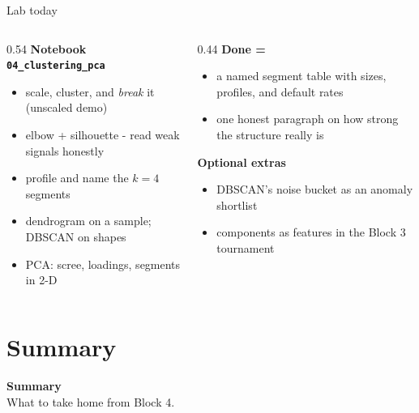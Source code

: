 \documentclass[10pt,aspectratio=169]{beamer}
\begin{document}
\begin{frame}{Lab today}
  \begin{columns}[T]
    \begin{column}{0.54\textwidth}
      \textbf{Notebook \texttt{04\_clustering\_pca}}
      \begin{itemize}\small
        \item scale, cluster, and \emph{break} it (unscaled demo)
        \item elbow + silhouette - read weak signals honestly
        \item profile and \alert{name} the $k=4$ segments
        \item dendrogram on a sample; DBSCAN on shapes
        \item PCA: scree, loadings, segments in 2-D
      \end{itemize}
    \end{column}
    \begin{column}{0.44\textwidth}
      \textbf{Done =}
      \begin{itemize}\small
        \item a named segment table with sizes, profiles, and default
              rates
        \item one honest paragraph on how strong the structure really is
      \end{itemize}
      \vspace{0.3em}
      \textbf{Optional extras}
      \begin{itemize}\small
        \item DBSCAN's noise bucket as an anomaly shortlist
        \item components as features in the Block 3 tournament
      \end{itemize}
    \end{column}
  \end{columns}
\end{frame}

\section{Summary}

\begin{frame}[plain]
  \begin{center}
    \vspace{1.5cm}
    {\LARGE\textbf{Summary}}\\[0.6cm]
    {\normalsize What to take home from Block 4.}
  \end{center}
\end{frame}
\end{document}

